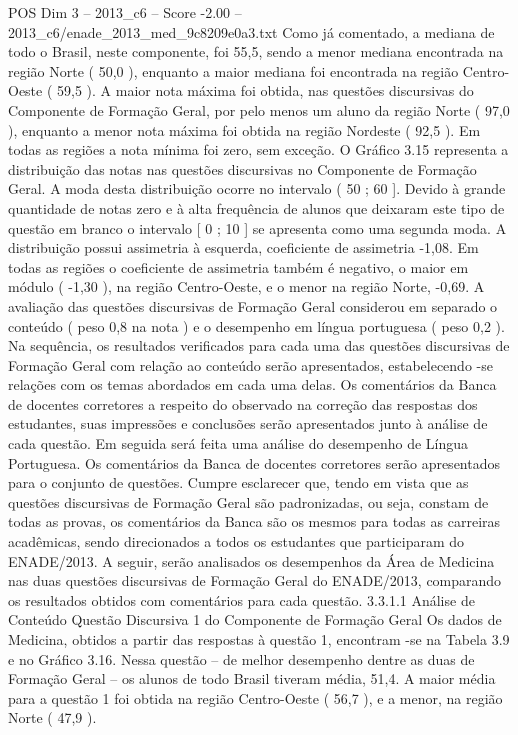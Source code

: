 \begin{textsample}{POS Dim 3 – 2013\_c6 – Score -2.00 – 2013\_c6/enade\_2013\_med\_9c8209e0a3.txt}
Como já comentado, a mediana de todo o Brasil, neste componente, foi 55,5, sendo a menor mediana encontrada na região Norte ( 50,0 ), enquanto a maior mediana foi encontrada na região Centro-Oeste ( 59,5 ).
A maior nota máxima foi obtida, nas questões discursivas do Componente de Formação Geral, por pelo menos um aluno da região Norte ( 97,0 ), enquanto a menor nota máxima foi obtida na região Nordeste ( 92,5 ).
Em todas as regiões a nota mínima foi zero, sem exceção.
O Gráfico 3.15 representa a distribuição das notas nas questões discursivas no Componente de Formação Geral.
A moda desta distribuição ocorre no intervalo ( 50 ; 60 ].
Devido à grande quantidade de notas zero e à alta frequência de alunos que deixaram este tipo de questão em branco o intervalo [ 0 ; 10 ] se apresenta como uma segunda moda.
A distribuição possui assimetria à esquerda, coeficiente de assimetria -1,08.
Em todas as regiões o coeficiente de assimetria também é negativo, o maior em módulo ( -1,30 ), na região Centro-Oeste, e o menor na região Norte, -0,69.
A avaliação das questões discursivas de Formação Geral considerou em separado o conteúdo ( peso 0,8 na nota ) e o desempenho em língua portuguesa ( peso 0,2 ).
Na sequência, os resultados verificados para cada uma das questões discursivas de Formação Geral com relação ao conteúdo serão apresentados, estabelecendo -se relações com os temas abordados em cada uma delas.
Os comentários da Banca de docentes corretores a respeito do observado na correção das respostas dos estudantes, suas impressões e conclusões serão apresentados junto à análise de cada questão.
Em seguida será feita uma análise do desempenho de Língua Portuguesa.
Os comentários da Banca de docentes corretores serão apresentados para o conjunto de questões.
Cumpre esclarecer que, tendo em vista que as questões discursivas de Formação Geral são padronizadas, ou seja, constam de todas as provas, os comentários da Banca são os mesmos para todas as carreiras acadêmicas, sendo direcionados a todos os estudantes que participaram do ENADE/2013.
A seguir, serão analisados os desempenhos da Área de Medicina nas duas questões discursivas de Formação Geral do ENADE/2013, comparando os resultados obtidos com comentários para cada questão. 3.3.1.1 Análise de Conteúdo Questão Discursiva 1 do Componente de Formação Geral Os dados de Medicina, obtidos a partir das respostas à questão 1, encontram -se na Tabela 3.9 e no Gráfico 3.16.
Nessa questão – de melhor desempenho dentre as duas de Formação Geral – os alunos de todo Brasil tiveram média, 51,4.
A maior média para a questão 1 foi obtida na região Centro-Oeste ( 56,7 ), e a menor, na região Norte ( 47,9 ).

\end{textsample}
